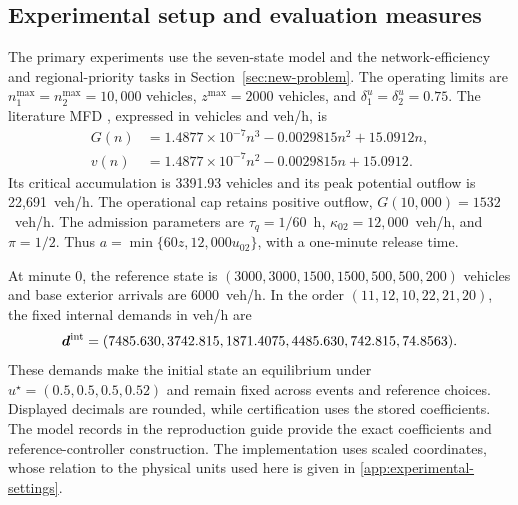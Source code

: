 \documentclass[preprint,12pt]{elsarticle}
\theoremstyle{definition}
\theoremstyle{plain}
\theoremstyle{definition}
\theoremstyle{plain}
\newcommand{\appref}[1]{\ref{#1}}
\begin{document}
\subsection{Experimental setup and evaluation measures}
\label{sec:experimental-setup}

The primary experiments use the seven-state model and the
network-efficiency and regional-priority tasks in
Section~\ref{sec:new-problem}. The operating limits are
$n_1^{\max}=n_2^{\max}=10{,}000$ vehicles, $z^{\max}=2000$ vehicles,
and $\delta_1^u=\delta_2^u=0.75$. The literature MFD
\cite{zhong2018robust}, expressed in vehicles and veh/h, is
\begin{equation}
\begin{aligned}
G(n)&=1.4877\times10^{-7}n^3-0.0029815n^2+15.0912n,\\
v(n)&=1.4877\times10^{-7}n^2-0.0029815n+15.0912.
\end{aligned}
\label{eq:new-mfd}
\end{equation}
Its critical accumulation is 3391.93 vehicles and its peak potential
outflow is 22,691~veh/h. The operational cap retains positive outflow,
$G(10{,}000)=1532$~veh/h. The admission parameters
are $\tau_q=1/60$~h, $\kappa_{02}=12{,}000$~veh/h, and $\pi=1/2$.
Thus $a=\min\{60z,12{,}000u_{02}\}$, with a one-minute release time.

At minute 0, the reference state is
$(3000,3000,1500,1500,500,500,200)$ vehicles and base exterior arrivals
are 6000~veh/h. In the order $(11,12,10,22,21,20)$, the fixed internal
demands in veh/h are
\begin{equation}
\boldsymbol d^{\rm int}=(7485.630,3742.815,1871.4075,
                        4485.630,742.815,74.8563).
\label{eq:new-incident-demands}
\end{equation}
These demands make the initial state an equilibrium under
$u^\star=(0.5,0.5,0.5,0.52)$ and remain fixed across events and reference
choices. Displayed decimals are rounded, while certification uses the
stored coefficients. The model records in the reproduction guide
\cite{perimeterReproductionGuide} provide the exact coefficients and
reference-controller construction. The implementation uses scaled
coordinates, whose relation to the physical units used here is given in
\appref{app:experimental-settings}.
\end{document}
